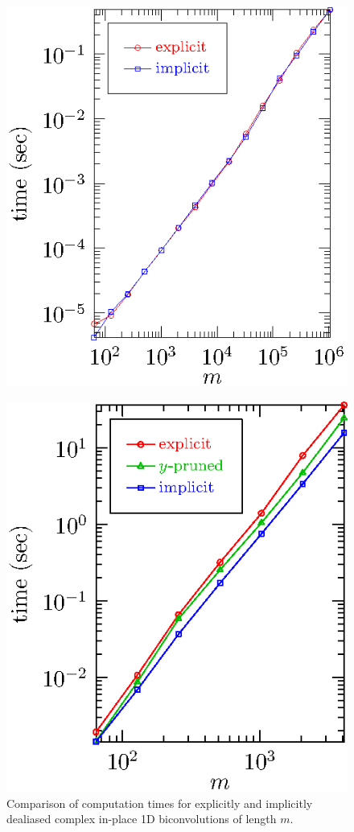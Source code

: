 \documentclass[final]{siamltex}
\begin{document}
\begin{figure}[htbp]
\begin{minipage}{0.48\linewidth}
\begin{center}
\includegraphics{timing1b}
\caption{Comparison of computation times for explicitly and implicitly
dealiased complex in-place 1D biconvolutions of length $m$.}
\label{timing1b}
\end{center}
\end{minipage}
%
\begin{minipage}{0.48\linewidth}
\begin{center}
\includegraphics{timing2b}

\end{center}
\end{minipage}
\end{figure}
\end{document}
